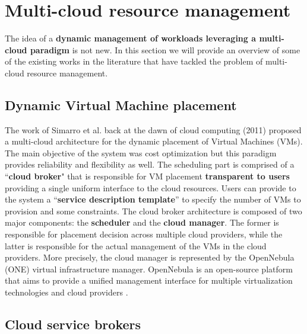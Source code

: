 
\section{Multi-cloud resource management}
\label{sec:multi_cloud_resource_management}

The idea of a \textbf{dynamic management of workloads leveraging a multi-cloud paradigm} is not new. 
In this section we will provide an overview of some of the existing works in the literature that have tackled the problem of multi-cloud resource management.

\subsection{Dynamic Virtual Machine placement}
The work of Simarro et al. \cite{Simarro_2011} back at the dawn of cloud computing (2011) proposed a multi-cloud architecture for the dynamic placement of Virtual Machines (VMs).
The main objective of the system was cost optimization but this paradigm provides reliability and flexibility as well.
The scheduling part is comprised of a ``\textbf{cloud broker}" that is responsible for VM placement \textbf{transparent to users} providing a single uniform interface to the cloud resources.
Users can provide to the system a ``\textbf{service description template}'' to specify the number of VMs to provision and some constraints.
The cloud broker architecture is composed of two major components: the \textbf{scheduler} and the \textbf{cloud manager}. The former is responsible for placement decision across multiple cloud providers, while the latter is responsible for the actual management of the VMs in the cloud providers. More precisely, the cloud manager is represented by the OpenNebula (ONE) virtual infrastructure manager.
OpenNebula is an open-source platform that aims to provide a unified management interface for multiple virtualization technologies and cloud providers \cite{open_nebula}.

\subsection{Cloud service brokers}


